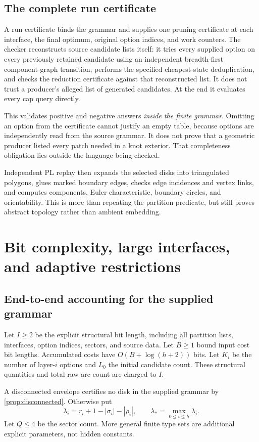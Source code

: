 \documentclass[11pt,a4paper]{article}
\theoremstyle{definition}
\theoremstyle{remark}
\begin{document}
\subsection{The complete run certificate}
A run certificate binds the grammar and supplies one pruning certificate at each interface,
the final optimum, original option indices, and work counters. The checker reconstructs
source candidate lists itself: it tries every supplied option on every previously retained
candidate using an independent breadth-first component-graph transition, performs the
specified cheapest-state deduplication, and checks the reduction certificate against that
reconstructed list. It does not trust a producer's alleged list of generated candidates.
At the end it evaluates every cap query directly.

This validates positive and negative answers \emph{inside the finite grammar}. Omitting an
option from the certificate cannot justify an empty table, because options are independently
read from the source grammar. It does not prove that a geometric producer listed every
patch needed in a knot exterior. That completeness obligation lies outside the language
being checked.

Independent PL replay then expands the selected disks into triangulated polygons, glues
marked boundary edges, checks edge incidences and vertex links, and computes components,
Euler characteristic, boundary circles, and orientability. This is more than repeating
the partition predicate, but still proves abstract topology rather than ambient embedding.

\section{Bit complexity, large interfaces, and adaptive restrictions}\label{sec:complexity}
\subsection{End-to-end accounting for the supplied grammar}
Let $I\ge2$ be the explicit structural bit length, including all partition lists, interfaces,
option indices, sectors, and source data. Let $B\ge1$ bound input cost bit lengths.
Accumulated costs have $O(B+\log(h+2))$ bits. Let $K_i$ be the number of layer-$i$
options and $L_0$ the initial candidate count. These structural quantities and total raw
arc count are charged to $I$.

A disconnected envelope certifies no disk in the supplied grammar by
\cref{prop:disconnected}. Otherwise put
\[
 \lambda_i=r_i+1-|\sigma_i|-|\rho_i|,\qquad
 \lambda_* =\max_{0\le i\le h}\lambda_i.
\]
Let $Q\le4$ be the sector count. More general finite type sets are additional explicit
parameters, not hidden constants.
\end{document}
